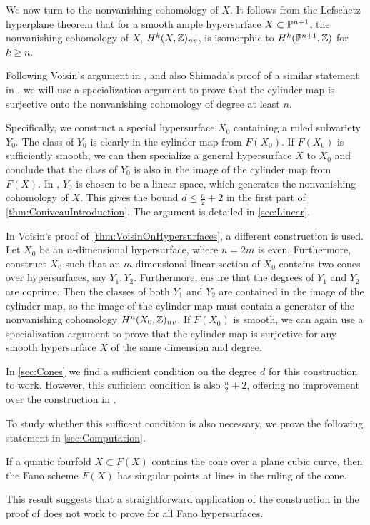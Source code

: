 We now turn to the nonvanishing cohomology of $X$. It follows from the Lefschetz hyperplane theorem that for a smooth ample hypersurface $X \subset \P^{n+1}$, the nonvanishing cohomology of $X$, $H^k(X,\Z)_{nv}$, is isomorphic to $H^k(\P^{n+1},\Z)$ for $k \geq n$.

Following Voisin's argument in \cite{VoisinConiveauThreefolds}, and also Shimada's proof of a similar statement in \cite[Theorem 2-ii]{ShimadaHypersurfaces}, we will use a specialization argument to prove that the cylinder map is surjective onto the nonvanishing cohomology of degree at least $n$.

Specifically, we construct a special hypersurface $X_0$ containing a ruled subvariety $Y_0$. The class of $Y_0$ is clearly in the cylinder map from $F(X_0)$. If $F(X_0)$ is sufficiently smooth, we can then specialize a general hypersurface $X$ to $X_0$ and conclude that the class of $Y_0$ is also in the image of the cylinder map from $F(X)$. In \cite[Theorem 2-ii]{ShimadaHypersurfaces}, $Y_0$ is chosen to be a linear space, which generates the nonvanishing cohomology of $X$. This gives the bound $d \leq \frac{n}{2}+2$ in the first part of \cref{thm:ConiveauIntroduction}. The argument is detailed in \cref{sec:Linear}.

In Voisin's proof of \cref{thm:VoisinOnHypersurfaces}, a different construction is used. Let $X_0$ be an $n$-dimensional hypersurface, where $n = 2m$ is even. Furthermore, construct $X_0$ such that an $m$-dimensional linear section of $X_0$ contains two cones over hypersurfaces, say $Y_1,Y_2$. Furthermore, ensure that the degrees of $Y_1$ and $Y_2$ are coprime. Then the classes of both $Y_1$ and $Y_2$ are contained in the image of the cylinder map, so the image of the cylinder map must contain a generator of the nonvanishing cohomology $H^n(X_0,\Z)_{nv}$. If $F(X_0)$ is smooth, we can again use a specialization argument to prove that the cylinder map is surjective for any smooth hypersurface $X$ of the same dimension and degree.

In \cref{sec:Cones} we find a sufficient condition on the degree $d$ for this construction to work. However, this sufficient condition is also $\frac{n}{2}+2$, offering no improvement over the construction in \cite[Theorem 2-ii]{ShimadaHypersurfaces}.

To study whether this sufficent condition is also necessary, we prove the following statement in \cref{sec:Computation}.
\begin{theorem}
	\label{thm:QuinticSingularIntro}
	If a quintic fourfold $X \subset F(X)$ contains the cone over a plane cubic curve, then the Fano scheme $F(X)$ has singular points at lines in the ruling of the cone.
\end{theorem}
This result suggests that a straightforward application of the construction in the proof of \cite[Theorem 1.13]{VoisinConiveauThreefolds} does not work to prove \cite[Theorem 1.13]{VoisinConiveauThreefolds} for all Fano hypersurfaces.

